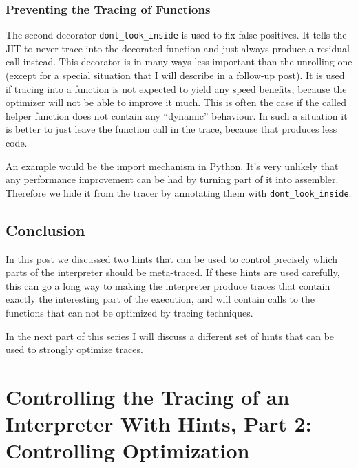 \documentclass{sig-alternate}
\begin{document}

\subsubsection{Preventing the Tracing of Functions}

The second decorator \texttt{dont\_look\_inside} is used to fix false positives. It
tells the JIT to never trace into the decorated function and just always produce
a residual call instead. This decorator is in many ways less important than the
unrolling one (except for a special situation that I will describe in a
follow-up post). It is used if tracing into a function is not expected to yield
any speed benefits, because the optimizer will not be able to improve it much.
This is often the case if the called helper function does not contain any
``dynamic'' behaviour. In such a situation it is better to just leave the function
call in the trace, because that produces less code.

An example would be the import mechanism in Python. It's very unlikely that any
performance improvement can be had by turning part of it into assembler.
Therefore we hide it from the tracer by annotating them with
\texttt{dont\_look\_inside}.



\subsection{Conclusion}

In this post we discussed two hints that can be used to control precisely which
parts of the interpreter should be meta-traced. If these hints are used
carefully, this can go a long way to making the interpreter produce traces that
contain exactly the interesting part of the execution, and will contain calls to
the functions that can not be optimized by tracing techniques.

In the next part of this series I will discuss a different set of hints that can
be used to strongly optimize traces.


\section{Controlling the Tracing of an Interpreter With Hints, Part 2: Controlling Optimization}
\end{document}
